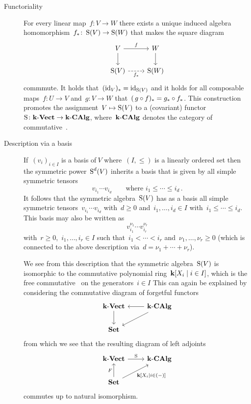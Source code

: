 \begin{recall}
\begin{description}
    \item[Functoriality]
      For every linear map~$f \colon V \to W$ there exists a unique induced algebra homomorphism~$f_* \colon \operatorname{S}(V) \to \operatorname{S}(W)$ that makes the square diagram
      \[
        \begin{tikzcd}
          V
          \arrow{r}[above]{f}
          \arrow{d}
          &
          W
          \arrow{d}
          \\
          \Symm(V)
          \arrow[dashed]{r}[below]{f_*}
          &
          \Symm(W)
        \end{tikzcd}
      \]
      commmute.
      It holds that~$(\operatorname{id}_V)_* = \operatorname{id}_{\operatorname{S}(V)}$ and it holds for all composable~{\linear{$\kf$}} maps~$f \colon U \to V$ and~$g \colon V \to W$ that~$(\, g \circ f)_* = g_* \circ f_*$.
      This construction promotes the assignment~$V \mapsto \operatorname{S}(V)$ to a (covariant) functor~$\operatorname{S} \colon \mathbf{k}\text{-}\mathbf{Vect} \to \mathbf{k}\text{-}\mathbf{CAlg}$, where~$\mathbf{k}\text{-}\mathbf{CAlg}$ denotes the category of commutative~{\algebras{$\kf$}}.
      
    \item[Description via a basis]
      If~$(v_i)_{i \in I}$ is a basis of$~V$ where~$(I, \leq)$ is a linearly ordered set then the symmetric power~$\operatorname{S}^d(V)$ inherits a basis that is given by all simple symmetric tensors
      \[
        v_{i_1} \dotsm v_{i_d}
        \qquad
        \text{where~$i_1 \leq \dotsb \leq i_d$} \,.
      \]
      It follows that the symmetric algebra~$\operatorname{S}(V)$ has as a basis all simple symmetric tensors~$v_{i_1} \dotsm v_{i_d}$ with~$d \geq 0$ and~$i_1, \dotsc, i_d \in I$ with~$i_1 \leq \dotsb \leq i_d$.
      This basis may also be written as
      \[
        v_{i_1}^{\nu_1} \dotsm v_{i_r}^{\nu_r}
      \]
      with~$r \geq 0$,~$i_1, \dotsc, i_r \in I$ such that~$i_1 < \dotsb < i_r$ and~$\nu_1, \dotsc, \nu_r \geq 0$ (which is connected to the above description via~$d = \nu_1 + \dotsb + \nu_r$).
      
      We see from this description that the symmetric algebra~$\operatorname{S}(V)$ is isomorphic to the commutative polynomial ring~$\kf[X_i \suchthat i \in I]$, which is the free commutative~{\algebra{$\kf$}} on the generators~$i \in I$
      This can again be explained by considering the commutative diagram of forgetful functors
      \[
        \begin{tikzcd}
          \cVect{\kf}
          \arrow{d}
          &
          \cCAlg{\kf}
          \arrow{l}
          \arrow{dl}
          \\
          \cSet
          &
          {}
        \end{tikzcd}
      \]
      from which we see that the resulting diagram of left adjoints
      \[
        \begin{tikzcd}
          \cVect{\kf}
          \arrow{r}[above]{\Symm}
          &
          \cCAlg{\kf}
          \\
          \cSet
          \arrow{u}[left]{F}
          \arrow{ur}[below right]{\kf[X_i \suchthat i \in (-)]}
          &
          {}
        \end{tikzcd}
      \]
      commutes up to natural isomorphism.
      

\end{description}
\end{recall}
